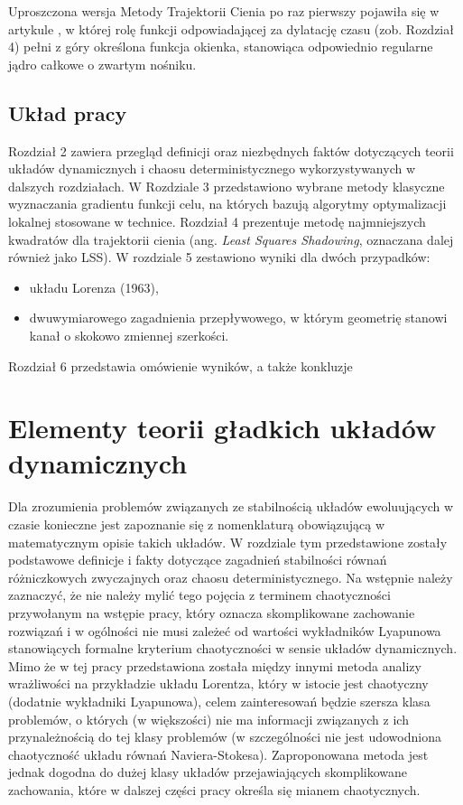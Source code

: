 \documentclass[12pt, twoside]{book}
\begin{document}
Uproszczona wersja Metody Trajektorii Cienia po raz pierwszy pojawiła się w artykule \cite{Chater}, w której rolę funkcji odpowiadającej za dylatację czasu (zob. Rozdział 4) pełni z góry określona funkcja okienka, stanowiąca odpowiednio regularne jądro całkowe o zwartym nośniku. 
\section{Układ pracy}
Rozdział 2 zawiera przegląd definicji oraz niezbędnych faktów dotyczących teorii układów dynamicznych i chaosu deterministycznego wykorzystywanych w dalszych rozdziałach. W Rozdziale 3 przedstawiono wybrane metody klasyczne wyznaczania gradientu funkcji celu, na których bazują algorytmy optymalizacji lokalnej stosowane w technice.  Rozdział 4 prezentuje metodę najmniejszych kwadratów dla trajektorii cienia (ang. \textit{Least Squares Shadowing}, oznaczana dalej również jako LSS). W rozdziale 5 zestawiono wyniki dla dwóch przypadków:
\begin{itemize}
	\item układu Lorenza (1963),
	\item dwuwymiarowego zagadnienia przepływowego, w którym geometrię stanowi kanał o skokowo zmiennej szerkości.
\end{itemize}
Rozdział 6 przedstawia omówienie wyników, a także konkluzje
\newpage
\chapter{Elementy teorii gładkich układów dynamicznych}
Dla zrozumienia problemów związanych ze stabilnością układów ewoluujących w czasie konieczne jest zapoznanie się z nomenklaturą obowiązującą w matematycznym opisie takich układów. W rozdziale tym przedstawione zostały podstawowe definicje i fakty dotyczące zagadnień stabilności równań różniczkowych zwyczajnych oraz chaosu deterministycznego. Na wstępnie należy zaznaczyć, że nie należy mylić tego pojęcia z terminem chaotyczności przywołanym na wstępie pracy, który oznacza skomplikowane zachowanie rozwiązań i w ogólności nie musi zależeć od wartości wykładników Lyapunowa stanowiących formalne kryterium chaotyczności w sensie układów dynamicznych. Mimo że w tej pracy przedstawiona została między innymi metoda analizy wrażliwości na przykładzie układu Lorentza, który w istocie jest chaotyczny (dodatnie wykładniki Lyapunowa), celem zainteresowań będzie szersza klasa problemów, o których (w większości) nie ma informacji związanych z ich przynależnością do tej klasy problemów (w szczególności nie jest udowodniona chaotyczność układu równań Naviera-Stokesa). Zaproponowana metoda jest jednak dogodna do dużej klasy układów przejawiających skomplikowane zachowania, które w dalszej części pracy określa się mianem chaotycznych.\newline
\end{document}
